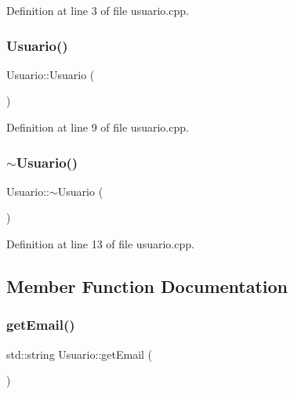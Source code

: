 Definition at line 3 of file usuario.\+cpp.

\mbox{\label{class_usuario_aa85a5371a098dfba5449140d9b8a472f}} 
\subsubsection{\texorpdfstring{Usuario()}{Usuario()}\hspace{0.1cm}{\footnotesize\ttfamily [2/2]}}
{\footnotesize\ttfamily Usuario\+::\+Usuario (\begin{DoxyParamCaption}{ }\end{DoxyParamCaption})}



Definition at line 9 of file usuario.\+cpp.

\mbox{\label{class_usuario_ab4096b0b8300ecb47b10c555fb09c997}} 
\subsubsection{\texorpdfstring{$\sim$\+Usuario()}{~Usuario()}}
{\footnotesize\ttfamily Usuario\+::$\sim$\+Usuario (\begin{DoxyParamCaption}{ }\end{DoxyParamCaption})}



Definition at line 13 of file usuario.\+cpp.



\subsection{Member Function Documentation}
\mbox{\label{class_usuario_ab47f811619c0f6e26d43f11393f2b143}} 
\subsubsection{\texorpdfstring{get\+Email()}{getEmail()}}
{\footnotesize\ttfamily std\+::string Usuario\+::get\+Email (\begin{DoxyParamCaption}{ }\end{DoxyParamCaption})}



